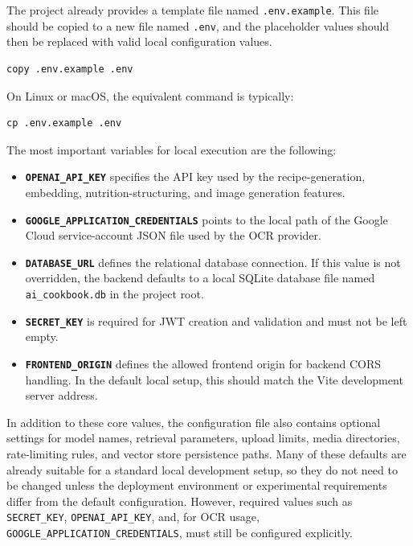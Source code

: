 The project already provides a template file named
\texttt{.env.example}. This file should be copied to a new file named
\texttt{.env}, and the placeholder values should then be replaced
with valid local configuration values.

\begin{lstlisting}
copy .env.example .env
\end{lstlisting}

On Linux or macOS, the equivalent command is typically:

\begin{lstlisting}
cp .env.example .env
\end{lstlisting}

The most important variables for local execution are the following:

\begin{itemize}
	\item \textbf{\texttt{OPENAI\_API\_KEY}} specifies the API key used by
	the recipe-generation, embedding, nutrition-structuring, and image
	generation features.
	\item \textbf{\texttt{GOOGLE\_APPLICATION\_CREDENTIALS}} points to the
	local path of the Google Cloud service-account JSON file used by the
	OCR provider.
	\item \textbf{\texttt{DATABASE\_URL}} defines the relational database
	connection. If this value is not overridden, the backend defaults to
	a local SQLite database file named \texttt{ai\_cookbook.db} in the
	project root.
	\item \textbf{\texttt{SECRET\_KEY}} is required for JWT creation and
	validation and must not be left empty.
	\item \textbf{\texttt{FRONTEND\_ORIGIN}} defines the allowed frontend
	origin for backend CORS handling. In the default local setup, this
	should match the Vite development server address.
\end{itemize}

In addition to these core values, the configuration file also
contains optional settings for model names, retrieval parameters,
upload limits, media directories, rate-limiting rules, and vector
store persistence paths. Many of these defaults are already suitable
for a standard local development setup, so they do not need to be
changed unless the deployment environment or experimental requirements
differ from the default configuration. However, required values such
as \texttt{SECRET\_KEY}, \texttt{OPENAI\_API\_KEY}, and, for OCR
usage, \texttt{GOOGLE\_APPLICATION\_CREDENTIALS}, must still be
configured explicitly.

